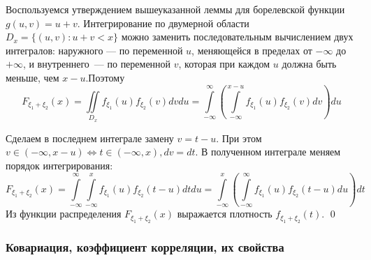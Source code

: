 \documentclass[oneside,final,14pt]{extreport}
\renewenvironment{proof}{{\bfseries Доказательство.}}{\qed}
\theoremstyle{plain}
\theoremstyle{definition}
\theoremstyle{named}
\begin{document}
\begin{proof}
    Воспользуемся утверждением вышеуказанной леммы для борелевской функции $g(u, v)=u+v$. Интегрирование по двумерной области $D_{x}=\{(u, v) : u+v<x\}$ можно заменить последовательным вычислением двух интегралов: наружного — по переменной $u$, меняющейся в пределах от $-\infty$ до $+\infty$, и внутреннего~--- по переменной $v$, которая при каждом $u$ должна быть меньше, чем $x-u$.Поэтому
    \begin{equation*}
        F_{\xi_{1}+\xi_{2}}(x)=\iint\limits_{D_{x}} f_{\xi_{1}}(u) f_{\xi_{2}}(v) d v d u=\int\limits_{-\infty}^{\infty}\left(\int\limits_{-\infty}^{x-u} f_{\xi_{1}}(u) f_{\xi_{2}}(v) d v\right) d u
    \end{equation*}
    
    Сделаем в последнем интеграле замену $v=t-u$. При этом $v \in(-\infty, x-u) \Leftrightarrow t \in(-\infty, x), d v=d t$. В полученном интеграле меняем порядок интегрирования:
    \begin{equation*}
        F_{\xi_{1}+\xi_{2}}(x)=\int\limits_{-\infty}^{\infty} \int\limits_{-\infty}^{x} f_{\xi_{1}}(u) f_{\xi_{2}}(t-u) d t d u=\int\limits_{-\infty}^{x}\left(\int\limits_{-\infty}^{\infty} f_{\xi_{1}}(u) f_{\xi_{2}}(t-u) d u\right) d t
    \end{equation*}
    Из функции распределения $F_{\xi_{1}+\xi_{2}}(x)$ выражается плотность $f_{\xi_{1}+\xi_{2}}(t)$.
\end{proof}

\subsubsection{Ковариация, коэффициент корреляции, их свойства}
\end{document}
